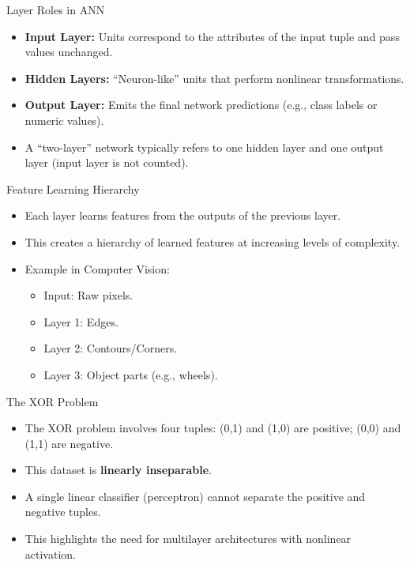 \documentclass[aspectratio=169]{beamer}
\begin{document}
\begin{frame}{Layer Roles in ANN}
    \begin{itemize}
        \item \textbf{Input Layer:} Units correspond to the attributes of the input tuple and pass values unchanged.
        \item \textbf{Hidden Layers:} ``Neuron-like'' units that perform nonlinear transformations.
        \item \textbf{Output Layer:} Emits the final network predictions (e.g., class labels or numeric values).
        \item A ``two-layer'' network typically refers to one hidden layer and one output layer (input layer is not counted).
    \end{itemize}
\end{frame}

\begin{frame}{Feature Learning Hierarchy}
    \begin{itemize}
        \item Each layer learns features from the outputs of the previous layer.
        \item This creates a hierarchy of learned features at increasing levels of complexity.
        \item Example in Computer Vision:
        \begin{itemize}
            \item Input: Raw pixels.
            \item Layer 1: Edges.
            \item Layer 2: Contours/Corners.
            \item Layer 3: Object parts (e.g., wheels).
        \end{itemize}
    \end{itemize}
\end{frame}

\begin{frame}{The XOR Problem}
    \begin{itemize}
        \item The XOR problem involves four tuples: (0,1) and (1,0) are positive; (0,0) and (1,1) are negative.
        \item This dataset is \textbf{linearly inseparable}.
        \item A single linear classifier (perceptron) cannot separate the positive and negative tuples.
        \item This highlights the need for multilayer architectures with nonlinear activation.
    \end{itemize}
\end{frame}
\end{document}
